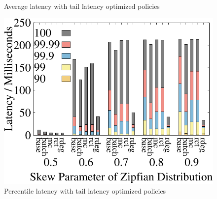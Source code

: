 \begin{figure}[t]
\begin{minipage}[b]{0.31\linewidth}
		\caption{Average latency with tail latency optimized policies}
		\label{fig:restart:latency}
	\end{minipage}
	\begin{minipage}[b]{0.31\linewidth}
	\centering
	\includegraphics[width=\textwidth]{./exp_fig/restart/percent100_latency}
	\caption{Percentile latency with tail latency optimized policies}
	\label{fig:restart:p100}
	\end{minipage}
\end{figure}

